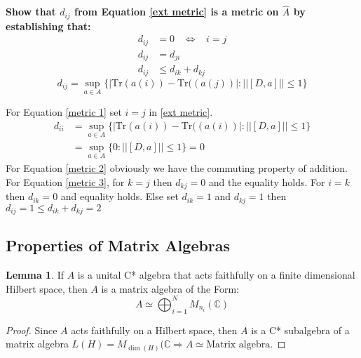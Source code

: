 \documentclass[a4paper]{article}
\newcounter{exercise}
\newenvironment{MyExercise}%
{\begin{mdframed}[style=exercisestyle]}{\end{mdframed}}
\theoremstyle{definition}
\theoremstyle{definition}
\theoremstyle{definition}
\theoremstyle{theorem}
\theoremstyle{theorem}
\newtheorem{lemma}{Lemma}
\begin{document}
\begin{MyExercise}
    \textbf{
    Show that $d_{ij}$ from Equation \ref{ext metric} is a metric on $\hat{A}$ by
    establishing that:
    \begin{align}
        d_{ij} &= 0\;\;\; \Leftrightarrow \;\;\; i=j \label{metric 1} \\
        d_{ij} &= d_{ji} \label{metric 2}\\
        d_{ij} &\leq d_{ik} + d_{kj} \label{metric 3}
    \end{align}
    \begin{equation} \label{ext metric}
        d_{ij} = \sup_{a\in A}\big\{|\text{Tr}(a(i)) - \text{Tr}((a(j))|: ||[D, a]|| \leq 1\big\}
    \end{equation}
}\newline

For Equation \ref{metric 1} set $i=j$ in \ref{ext metric}.
\begin{align*}
    d_{ii} &= \sup_{a \in A}\{|\text{Tr}(a(i)) - \text{Tr}((a(i))|: ||[D, a]|| \leq
    1\big\} \\
    &= \sup_{a \in A}\{0: ||[D, a]|| \leq 1\big\} = 0
\end{align*}
For Equation \ref{metric 2} obviously we have the commuting property of
addition.
\newline
For Equation \ref{metric 3}, for $k=j$ then $d_{kj} = 0$ and the equality
holds. For $i = k$ then $d_{ik} = 0$ and equality holds. Else set $d_{ik} =
1$ and $d_{kj} = 1$ then $d_{ij} = 1 \leq d_{ik} + d_{kj} = 2$
\end{MyExercise}

\subsection{Properties of Matrix Algebras}
\begin{lemma}
    If $A$ is a unital C* algebra that acts faithfully on a finite
    dimensional Hilbert space, then $A$ is a matrix algebra of the Form:
    \begin{equation}
        A \simeq \bigoplus _{i=1}^N M_{n_i}(\mathbb{C})
    \end{equation}
\end{lemma}
\begin{proof}
    Since $A$ acts faithfully on a Hilbert space, then $A$ is a C*
    subalgebra of a matrix algebra $L(H) = M_{\dim (H)}(\mathbb{C}
    \Rightarrow A \simeq \text{Matrix algebra}$.
\end{proof}
\end{document}
